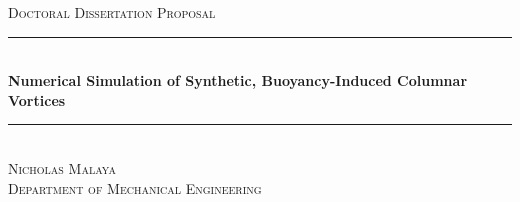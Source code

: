 \begin{titlepage}

\newcommand{\HRule}{\rule{\linewidth}{0.5mm}} %

\center %
 

\textsc{\LARGE Doctoral Dissertation Proposal}\\[1.5cm] %


\HRule \\[0.4cm]
{ \Large \bfseries Numerical Simulation of Synthetic, Buoyancy-Induced Columnar Vortices}\\[0.4cm] %
\HRule \\[1.5cm]
\textsc{\Large Nicholas Malaya}\\[0.5cm] %
\textsc{\large Department of Mechanical Engineering}\\[2.5cm] %
 


\end{titlepage}
